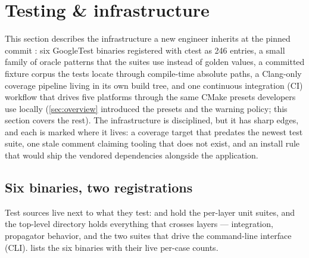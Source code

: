 \section{Testing \& infrastructure}\label{sec:testing}

This section describes the infrastructure a new engineer inherits at the pinned commit
: six GoogleTest binaries registered with ctest as 246 entries, a small
family of oracle patterns that the suites use instead of golden values, a committed
fixture corpus the tests locate through compile-time absolute paths, a Clang-only
 coverage pipeline living in its own build tree, and one continuous
integration (CI) workflow that drives five platforms through the same CMake
presets developers use locally (\cref{sec:overview} introduced the presets and the
warning policy; this section covers the rest). The infrastructure is disciplined, but it
has sharp edges, and each is marked where it lives: a coverage target that predates the
newest test suite, one stale comment claiming tooling that does not exist, and an install
rule that would ship the vendored dependencies alongside the application.

\subsection{Six binaries, two registrations}\label{sec:testing-binaries}

Test sources live next to what they test:  and  hold
the per-layer unit suites, and the top-level  directory holds everything
that crosses layers --- integration, propagator behavior, and the two suites that drive
the command-line interface (CLI).  lists the six binaries with
their live per-case counts.

